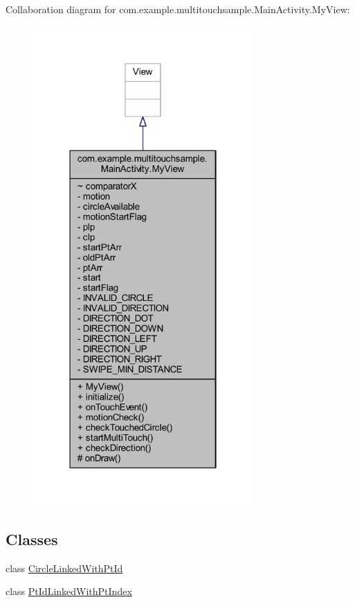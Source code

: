 Collaboration diagram for com.\+example.\+multitouchsample.\+Main\+Activity.\+My\+View\+:
\nopagebreak
\begin{figure}[H]
\begin{center}
\leavevmode
\includegraphics[width=238pt]{classcom_1_1example_1_1multitouchsample_1_1_main_activity_1_1_my_view__coll__graph}
\end{center}
\end{figure}
\subsection*{Classes}
\begin{DoxyCompactItemize}
\item 
class \hyperlink{classcom_1_1example_1_1multitouchsample_1_1_main_activity_1_1_my_view_1_1_circle_linked_with_pt_id}{Circle\+Linked\+With\+Pt\+Id}
\item 
class \hyperlink{classcom_1_1example_1_1multitouchsample_1_1_main_activity_1_1_my_view_1_1_pt_id_linked_with_pt_index}{Pt\+Id\+Linked\+With\+Pt\+Index}
\end{DoxyCompactItemize}
